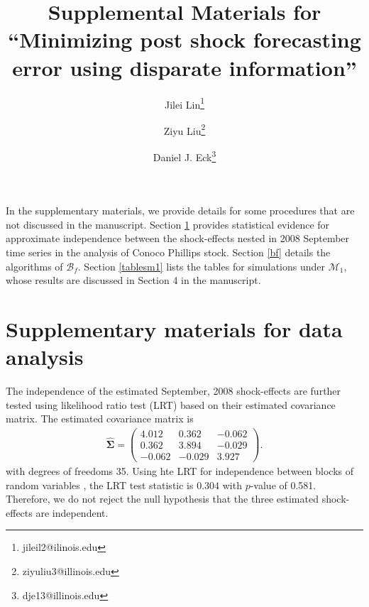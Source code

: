 \documentclass[11pt]{article}
\title{Supplemental Materials for ``Minimizing post shock forecasting error using disparate information''}
\author{Jilei Lin\thanks{jileil2@ilinois.edu}}
\author{Ziyu Liu\thanks{ziyuliu3@illinois.edu}}
\author{Daniel J. Eck\thanks{dje13@illinois.edu}}
\affil{Department of Statistics, University of Illinois at Urbana-Champaign}
\def\mc#1{\mathcal{#1}} %
\theoremstyle{definition}
\begin{document}
\maketitle

In the supplementary materials, we provide details for some procedures that are not discussed in the manuscript. Section \ref{smfda} provides statistical evidence for approximate independence between  the shock-effects nested in 2008 September time series in the analysis of Conoco Phillips stock. Section \ref{bf} details the algorithms of $\mc{B}_f$. Section  \ref{tablesm1} lists the tables for simulations under $\mc{M}_1$, whose results are discussed in Section 4 in the manuscript.


\section{Supplementary materials for data analysis}
\label{smfda}
The independence of the estimated September, 2008 shock-effects are further tested using likelihood ratio test (LRT) based on their estimated covariance matrix. The estimated covariance matrix is
\begin{align*}
  \hat{\mathbf{\Sigma}}=\left(\begin{array}{rrr}
    4.012 & 0.362 & -0.062 \\
    0.362 & 3.894 & -0.029 \\
    -0.062 & -0.029 & 3.927
  \end{array}\right).
\end{align*}
with degrees of freedoms 35. Using hte LRT for independence between blocks of random variables \citep[Section 10.2]{msos}, the LRT test statistic is $0.304$ with $p$-value of 0.581. Therefore, we do not reject  the null hypothesis that the three estimated shock-effects are independent.
\end{document}
